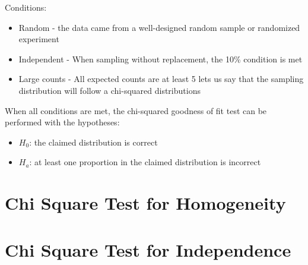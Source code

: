 \documentclass[../stats.tex]{subfiles}
\begin{document}
Conditions:
\begin{itemize}
    \item Random - the data came from a well-designed random sample or randomized experiment 
    \item Independent - When sampling without replacement, the 10\% condition is met 
    \item Large counts - All expected counts are at least 5 lets us say that the sampling distribution will follow a chi-squared distributions
\end{itemize}

When all conditions are met, the chi-squared goodness of fit test can be performed with the hypotheses:
\begin{itemize}
    \item $H_0$: the claimed distribution is correct
    \item $H_a$: at least one proportion in the claimed distribution is incorrect
\end{itemize}


\section{Chi Square Test for Homogeneity}

\section{Chi Square Test for Independence}
\end{document}
